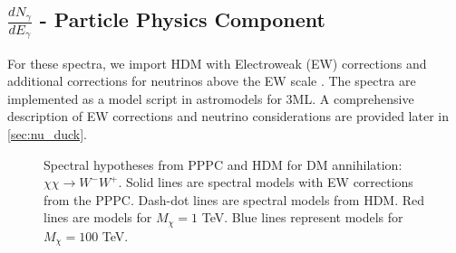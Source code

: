 \subsection{$\frac{dN_\gamma}{dE_\gamma}$ - Particle Physics Component}\label{sec:mtd_particlephysics}

For these spectra, we import HDM with Electroweak (EW) corrections and additional corrections for neutrinos above the EW scale \cite{HDMSpectra}.
The spectra are implemented as a model script in astromodels for 3ML.
A comprehensive description of EW corrections and neutrino considerations are provided later in \cref{sec:nu_duck}.

\begin{figure}[t]
    \caption{Spectral hypotheses from PPPC \cite{Cirelli_2011} and HDM \cite{HDMSpectra} for DM annihilation: $\chi\chi \rightarrow W^-W^+$. Solid lines are spectral models with EW corrections from the PPPC. Dash-dot lines are spectral models from HDM. Red lines are models for $M_\chi = 1$ TeV. Blue lines represent models for $M_\chi = 100$ TeV.}
    \label{fig:pppc_vs_hdm}
\end{figure}

